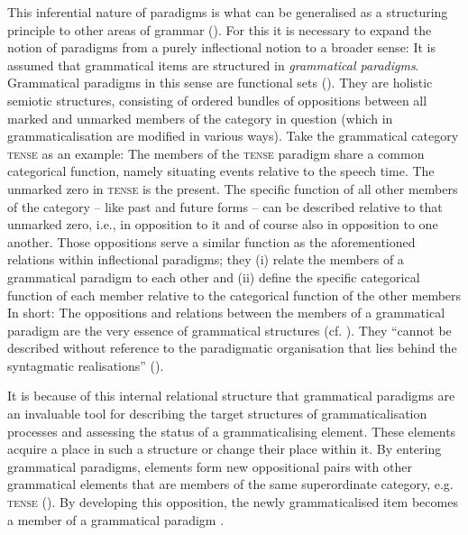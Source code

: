 \documentclass[output=paper]{langsci/langscibook}
\begin{document}
This inferential nature of paradigms is what can be generalised as a structuring principle to other areas of grammar (\citealt[xi]{Nørgård-Sørensen2011}). For this it is necessary to expand the notion of paradigms from a purely inflectional notion to a broader sense: It is assumed that grammatical items are structured in \textit{grammatical paradigms}. Grammatical paradigms in this sense are functional sets (\citealt{Andersen2008, Diewald2020a, Nørgård-Sørensen2011, Politt2021}).  They are holistic semiotic structures, consisting of ordered bundles of oppositions between all marked and unmarked members of the category in question (which in grammaticalisation are modified in various ways). Take the grammatical category \textsc{tense} as an example: The members of the \textsc{tense} paradigm share a common categorical function, namely situating events relative to the speech time. The unmarked zero in \textsc{tense} is the present. The specific function of all other members of the category – like past and future forms – can be described relative to that unmarked zero, i.e., in opposition to it and of course also in opposition to one another. Those oppositions serve a similar function as the aforementioned relations within inflectional paradigms; they (i) relate the members of a grammatical paradigm to each other and (ii) define the specific categorical function of each member relative to the categorical function of the other members In short: The oppositions and relations between the members of a grammatical paradigm are the very essence of grammatical structures (cf. \citealt{Politt2021}). They “cannot be described without reference to the paradigmatic organisation that lies behind the syntagmatic realisations” (\citealt[71]{Nørgård-Sørensen2011}).\largerpage

It is because of this internal relational structure that grammatical paradigms are an invaluable tool for describing the target structures of grammaticalisation processes and assessing the status of a grammaticalising element. These elements acquire a place in such a structure or change their place within it. By entering grammatical paradigms, elements form new oppositional pairs with other grammatical elements that are members of the same superordinate category, e.g. \textsc{tense} (\citealt[4]{DiewaldSmirnova2010}). By developing this opposition, the newly grammaticalised item becomes a member of a grammatical paradigm \citep{BybeeEtAl1994,Lehmann2015}. 
\end{document}
